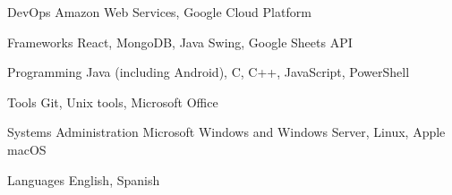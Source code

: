 

\begin{cvskills}

  \cvskill
    {DevOps} %
    {Amazon Web Services, Google Cloud Platform} %

  \cvskill
    {Frameworks} %
    {React, MongoDB, Java Swing, Google Sheets API} %

  \cvskill
    {Programming} %
    {Java (including Android), C, C++, JavaScript, PowerShell} %
    
  \cvskill
    {Tools} %
    {Git, Unix tools, Microsoft Office} %
    
  \cvskill
    {Systems Administration} %
    {Microsoft Windows and Windows Server, Linux, Apple macOS} %

  \cvskill
    {Languages} %
    {English, Spanish} %

\end{cvskills}
